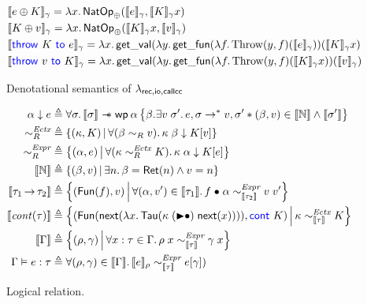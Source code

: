 \begin{figure}
\begin{align*}
    &\sem{\natop{\expr}{K}}_\gamma = \Lam x. \NATOP_{\oplus}(\sem{\expr}_\gamma, \sem{K}_\gamma x) \\
    &\sem{\natop{K}{\val}}_\gamma = \Lam x. \NATOP_{\oplus}(\sem{K}_\gamma x, \sem{\val}_\gamma) \\
    &\sem{\throw{K}{\expr}}_\gamma = \Lam x. \getval (\Lam y. \getfun (\Lam f. \throwGT(y, f) (\sem{\expr}_\gamma)) (\sem{K}_\gamma x)\\
    &\sem{\throw{\val}{K}}_\gamma = \Lam x. \getval (\Lam y. \getfun (\Lam f. \throwGT(y, f) (\sem{K}_\gamma x)) (\sem{\val}_\gamma)
  \end{align*}
  \caption{Denotational semantics of $\lambda_{\mathsf{rec},\mathsf{io,callcc}}$}
  \label{fig:lang_sem}
\end{figure}

\begin{figure}
  \begin{align*}
    \alpha \downarrow \expr &\eqdef \All \sigma. \sem{\sigma} \wand \wpre{\alpha}{\beta. \Exists \val\;\sigma'. \expr, \sigma \rightarrow^* \val, \sigma' \ast (\beta, \val) \in \sem{\tnat} \land \sem{\sigma'}}\\
    \sim_R^{\Ectx} &\eqdef \setComp{(\kappa, K)}{\All (\beta \sim_R \val). \eapp{\kappa}{\beta} \downarrow \plug{K}{\val}}\\
    \sim_R^{\Expr} &\eqdef \setComp{(\alpha, \expr)}{\All (\kappa \sim_R^{\Ectx} K). \eapp{\kappa}{\alpha} \downarrow \plug{K}{\expr}}\\
    \sem{\tnat} &\eqdef \setComp{(\beta, \val)}{\Exists n. \beta = \Rret(n) \land \val = n}\\
    \sem{\tarr{\tau_1}{\tau_2}} &\eqdef \setComp{(\Fun(f), \val)}{\All (\alpha, \val') \in \sem{\tau_1}. \APPs{f}{\alpha} \sim_{\sem{\tau_2}}^{\Expr} \eapp{\val}{\val'}}\\
    \sem{\tcont{\tau}} &\eqdef \setComp{(\Fun(\Next(\Lam x. \Tau (\APPsl{\kappa}{\Next(x)}))), \cont{K})}{\kappa \sim_{\sem{\tau}}^{\Ectx} K}\\
    \sem{\Gamma} &\eqdef \setComp{(\rho, \gamma)}{\All \var \col \tau \in \Gamma. \eapp{\rho}{\var} \sim_{\sem{\tau}}^{\Expr} \eapp{\gamma}{\var}}\\
    \Gamma \vDash \expr \col \tau &\eqdef \All (\rho, \gamma) \in \sem{\Gamma}. \sem{\expr}_\rho \sim_{\sem{\tau}}^{\Expr} \plug{\expr}{\gamma})
  \end{align*}
\caption{Logical relation.}
\label{fig:logrel}
\end{figure}

